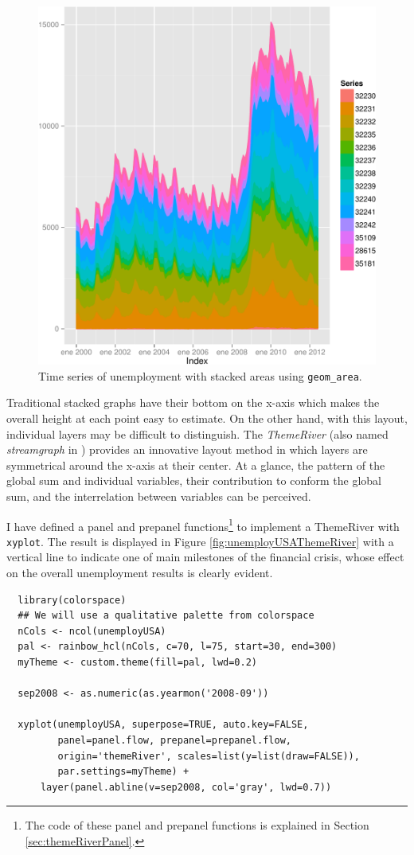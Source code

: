 \documentclass[smallroyalvopaper]{memoir}
\begin{document}
\begin{figure}[htbp]
\centering
\includegraphics[width=.9\linewidth]{figs/unemployUSAgeomArea.pdf}
\caption{Time series of unemployment with stacked areas using \texttt{geom\_area}. \label{fig:unemployUSAgeomArea}}
\end{figure}

Traditional stacked graphs have their bottom on the x-axis which makes
the overall height at each point easy to estimate. On the other hand,
with this layout, individual layers may be difficult to
distinguish. The \emph{ThemeRiver} \cite{Havre.Hetzler.ea2002} (also named
\emph{streamgraph} in \cite{Byron.Wattenberg2008}) provides an innovative
layout method in which layers are symmetrical around the x-axis at
their center. At a glance, the pattern of the global sum and
individual variables, their contribution to conform the global sum,
and the interrelation between variables can be perceived.

I have defined a panel and prepanel functions\footnote{The code of these panel and prepanel functions is explained
in Section \ref{sec:themeRiverPanel}.} to implement a
ThemeRiver with \texttt{xyplot}. The result is displayed in Figure
\ref{fig:unemployUSAThemeRiver} with a vertical line to indicate
one of main milestones of the financial crisis, whose effect on
the overall unemployment results is clearly evident.
\lstset{language=r,label= ,caption= ,captionpos=b,numbers=none}
\begin{lstlisting}
  library(colorspace)
  ## We will use a qualitative palette from colorspace
  nCols <- ncol(unemployUSA)
  pal <- rainbow_hcl(nCols, c=70, l=75, start=30, end=300)
  myTheme <- custom.theme(fill=pal, lwd=0.2)
  
  sep2008 <- as.numeric(as.yearmon('2008-09'))
  
  xyplot(unemployUSA, superpose=TRUE, auto.key=FALSE,
         panel=panel.flow, prepanel=prepanel.flow,
         origin='themeRiver', scales=list(y=list(draw=FALSE)),
         par.settings=myTheme) +
      layer(panel.abline(v=sep2008, col='gray', lwd=0.7))
\end{lstlisting}
\end{document}
